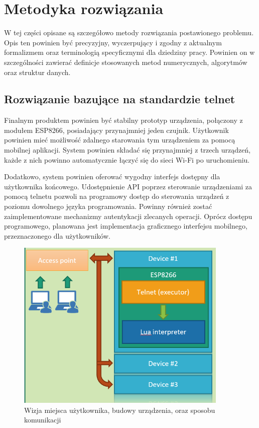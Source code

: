 \section{Metodyka rozwiązania}
\label{sec:metodyka-rozwiazania}
W tej części opisane są szczegółowo metody rozwiązania postawionego problemu. Opis ten powinien być precyzyjny, wyczerpujący i zgodny z aktualnym formalizmem oraz terminologią specyficznymi dla dziedziny pracy. Powinien on w szczególności zawierać definicje stosowanych metod numerycznych, algorytmów oraz struktur danych.

\subsection{Rozwiązanie bazujące na standardzie telnet}
Finalnym produktem powinien być stabilny prototyp urządzenia, połączony z modułem ESP8266, posiadający przynajmniej jeden czujnik. Użytkownik powinien mieć możliwość zdalnego starowania tym urządzeniem za pomocą mobilnej aplikacji. System powinien składać się przynajmniej z trzech urządzeń, każde z nich powinno automatycznie łączyć się do sieci Wi-Fi po uruchomieniu. 

Dodatkowo, system powinien oferować wygodny interfejs dostępny dla użytkownika końcowego. Udostępnienie API poprzez sterowanie urządzeniami za pomocą telnetu pozwoli na programowy dostęp do sterowania urządzeń z poziomu dowolnego języka programowania. Powinny również zostać zaimplementowane mechanizmy autentykacji zlecanych operacji. Oprócz dostępu programowego, planowana jest implementacja graficznego interfejsu mobilnego, przeznaczonego dla użytkowników\cite{kukdm-art}.

\begin{figure}[!htbp]
	\centering
	\includegraphics[width=0.9\textwidth]{images/fig01-arch-overview.png}
	\caption[Wizja architektury systemu.]{Wizja miejsca użytkownika, budowy urządzenia, oraz sposobu komunikacji}
	\label{fig:arch-overview}
\end{figure}

